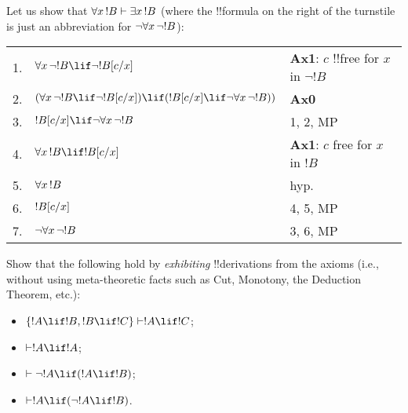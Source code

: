 \documentclass[../../include/open-logic-section]{subfiles}
\begin{document}


Let us show that $\lforall[x][!B] \Proves \lexists[x][!B]$
(where the !!{formula} on the right of the turnstile is just an
abbreviation for $\lnot \lforall[x][\lnot !B]$):

\begin{tabular}{rll}
 1. & $\lforall[x][\lnot !B] \lif \lnot \Subst{!B}{c}{x}$ &
 \textbf{Ax1}: $c$ !!{free for} $x$ in $\lnot !B$ \\
 2. &  $(\lforall[x][\lnot !B] \lif \lnot \Subst{!B}{c}{x}) \lif
 (\Subst{!B}{c}{x} \lif \lnot\lforall[x][\lnot !B]))$ & \textbf{Ax0}\\
 3. & $\Subst{!B}{c}{x} \lif \lnot\lforall[x][\lnot !B]$ & 1, 2, MP\\
 4. & $\lforall[x][!B] \lif \Subst{!B}{c}{x}$ & \textbf{Ax1}: $c$ free
 for $x$ in $!B$ \\
 5. & $\lforall[x][!B]$ & hyp. \\
 6. & $!B[c/x]$ & 4, 5, MP \\
 7. & $\lnot \lforall[x][\lnot !B]$ & 3, 6, MP
\end{tabular}

\begin{prob} Show that the following hold by \emph{exhibiting}
!!{derivation}s from the axioms (i.e., without using meta-theoretic facts
such as Cut, Monotony, the Deduction Theorem, etc.): 
\begin{itemize} \item
$\{!A\lif !B, !B\lif !C\} \Proves !A\lif !C$; 
\item $\Proves !A \lif !A$;
\item $\Proves \lnot !A \lif (!A \lif !B)$;
 \item $\Proves !A \lif
(\lnot !A \lif !B)$. 
\end{itemize} 
\end{prob}
\end{document}

